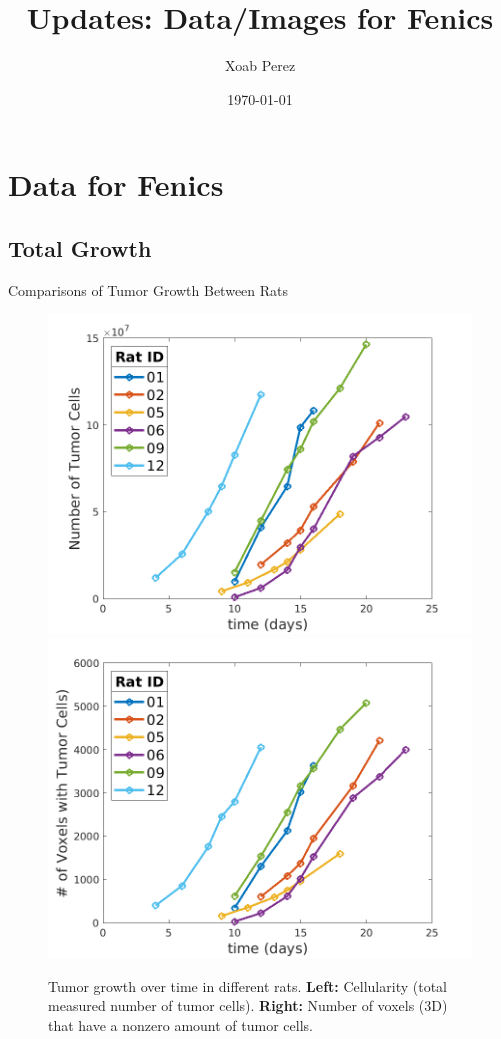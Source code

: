 \documentclass{beamer}
\title[Updates]{Updates: Data/Images for Fenics}
\author{Xoab Perez}
\date{\today}
\begin{document}
\begin{frame}
  \titlepage
\end{frame}


\section{Data for Fenics}
\subsection{Total Growth}

\begin{frame}{Comparisons of Tumor Growth Between Rats}
	\begin{minipage}[T][.7\textheight][t]{\textwidth}
		\begin{figure}
    	\centering
    	\includegraphics[width=.45\textwidth]{../../mouse-data/images/numtumorcells.png}    	
    	\includegraphics[width=.45\textwidth]{../../mouse-data/images/voxtumorcells.png}
    	\caption{Tumor growth over time in different rats. \textbf{Left:} Cellularity (total measured number of tumor cells). \textbf{Right:} Number of voxels (3D) that have a nonzero amount of tumor cells.}
    	\end{figure}
	\end{minipage}
\end{frame}
\end{document}
